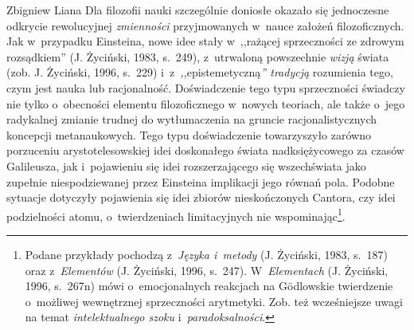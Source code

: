 \begin{artplenv}{Zbigniew Liana}
Dla filozofii nauki szczególnie doniosłe okazało się jednoczesne odkrycie rewolucyjnej \textit{zmienności} przyjmowanych w~nauce
założeń filozoficznych. Jak w~przypadku Einsteina, nowe idee stały w~,,rażącej sprzeczności ze zdrowym rozsądkiem''
\label{ref:RND5BoFYxeq4l}(J. Życiński, 1983, s.~249), z~utrwaloną powszechnie \textit{wizją} świata
\label{ref:RND3mHQnO08gW}(zob. J. Życiński, 1996, s.~229) i~z~\textit{,,}epistemetyczną\textit{'' tradycją} rozumienia tego,
czym jest nauka lub racjonalność.  Doświadczenie tego typu sprzeczności świadczy nie tylko o~obecności elementu
filozoficznego w~nowych teoriach, ale także o~jego radykalnej zmianie trudnej do wytłumaczenia na gruncie
racjonalistycznych koncepcji metanaukowych. Tego typu doświadczenie towarzyszyło zarówno porzuceniu arystotelesowskiej
idei doskonałego świata nadksiężycowego za czasów Galileusza, jak i~pojawieniu się idei rozszerzającego się
wszechświata jako zupełnie niespodziewanej przez Einsteina implikacji jego równań pola. Podobne sytuacje dotyczyły
pojawienia się idei zbiorów nieskończonych Cantora, czy idei podzielności atomu, o~twierdzeniach limitacyjnych nie
wspominając\footnote{Podane przykłady pochodzą z~\textit{Języka i~metody} \label{ref:RNDrtmG57I1dG}(J. Życiński, 1983,
s.~187) oraz z~\textit{Elementów} \label{ref:RNDorQuglTydR}(J. Życiński, 1996, s.~247). W~\textit{Elementach}
\label{ref:RNDYo0f9hcHkW}(J. Życiński, 1996, s.~267n) mówi o~emocjonalnych reakcjach na Gödlowskie twierdzenie o~możliwej
wewnętrznej sprzeczności arytmetyki. Zob. też wcześniejsze uwagi na temat \textit{intelektualnego szoku} i~\textit{paradoksalności}.}.


\end{artplenv}
